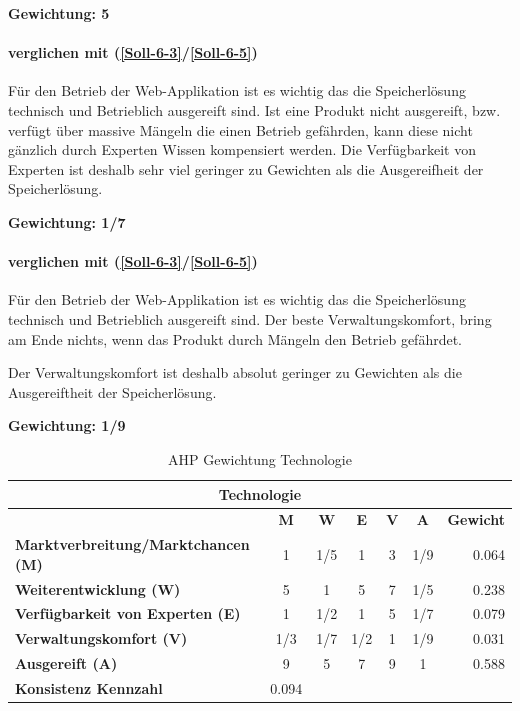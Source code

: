 \textbf{Gewichtung: 5}

\paragraph*{ verglichen mit  (\ref{Soll-6-3}/\ref{Soll-6-5})}
Für den Betrieb der Web-Applikation ist es wichtig das die Speicherlösung technisch und Betrieblich ausgereift sind. Ist eine Produkt nicht ausgereift, bzw. verfügt über massive Mängeln die einen Betrieb gefährden, kann diese nicht gänzlich durch Experten Wissen kompensiert werden. Die Verfügbarkeit von Experten ist deshalb sehr viel geringer zu Gewichten als die Ausgereifheit der Speicherlösung.

\textbf{Gewichtung: 1/7}

\paragraph*{ verglichen mit  (\ref{Soll-6-3}/\ref{Soll-6-5})}
Für den Betrieb der Web-Applikation ist es wichtig das die Speicherlösung technisch und Betrieblich ausgereift sind. Der beste Verwaltungskomfort, bring am Ende nichts, wenn das Produkt durch Mängeln den Betrieb gefährdet.

Der Verwaltungskomfort ist deshalb absolut geringer zu Gewichten als die Ausgereiftheit der Speicherlösung.

\textbf{Gewichtung: 1/9}

\begin{table}[htbp]
\caption{AHP Gewichtung Technologie}
\begin{tabular}{|l|c|c|c|c|c|r|}
\hline
\multicolumn{ 7}{|c|}{\textbf{Technologie}} \\ \hline
 & \textbf{M} & \textbf{W} & \textbf{E} & \textbf{V} & \textbf{A} & \multicolumn{1}{l|}{\textbf{Gewicht}} \\ \hline
\textbf{Marktverbreitung/Marktchancen (M)} & 1 & 1/5 & 1 & 3 & 1/9 & 0.064 \\ \hline
\textbf{Weiterentwicklung (W)} & 5 & 1 & 5 & 7 & 1/5 & 0.238 \\ \hline
\textbf{Verfügbarkeit von Experten (E)} & 1 & 1/2 & 1 & 5 & 1/7 & 0.079 \\ \hline
\textbf{Verwaltungskomfort (V)} & 1/3 & 1/7 & 1/2 & 1 & 1/9 & 0.031 \\ \hline
\textbf{Ausgereift (A)} & 9 & 5 & 7 & 9 & 1 & 0.588 \\ \hline
\textbf{Konsistenz Kennzahl} & \multicolumn{1}{r|}{0.094}  \\ \cline{1-2}
\end{tabular}
\label{AHPTechnologie}
\end{table}


